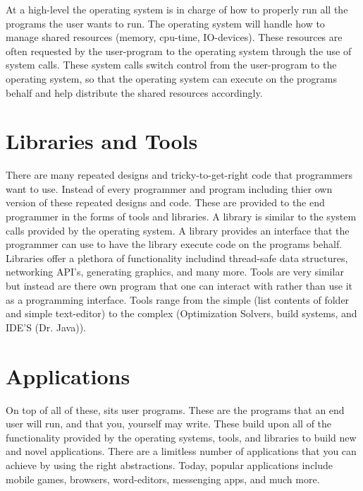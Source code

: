 At a high-level the operating system is in charge of how to properly run all the
programs the user wants to run. The operating system will handle how to manage
shared resources (memory, cpu-time, IO-devices). These resources are often
requested by the user-program to the operating system through the use of system calls.
These system calls switch control from the user-program to the operating system,
so that the operating system can execute on the programs behalf and help
distribute the shared resources accordingly.

\section{Libraries and Tools}
There are many repeated designs and tricky-to-get-right code that programmers
want to use. Instead of every programmer and program including thier own
version of these repeated designs and code. These are provided to the
end programmer in the forms of tools and libraries. A library is
similar to the system calls provided by the operating system. A library
provides an interface that the programmer can use to have the library
execute code on the programs behalf. Libraries offer a plethora of
functionality includind thread-safe data structures, networking
API's, generating graphics, and many more. Tools are very similar
but instead are there own program that one can interact with
rather than use it as a programming interface. Tools range
from the simple (list contents of folder and simple text-editor)
to the complex (Optimization Solvers, build systems, and IDE'S (Dr. Java)).

\section{Applications}
On top of all of these, sits user programs. These are the programs that
an end user will run, and that you, yourself may write. These build upon
all of the functionality provided by the operating systems, tools,
and libraries to build new and novel applications. There are a limitless
number of applications that you can achieve by using the right
abstractions. Today, popular applications include mobile games,
browsers, word-editors, messenging apps, and much more.


